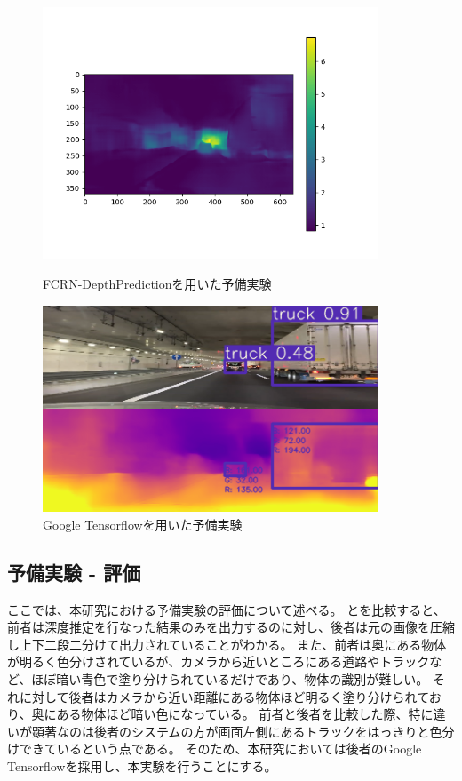 \begin{figure}[htbp]
   \begin{center}
    \includegraphics[width=10cm]{figs/preex1.png}
   \end{center}
   \caption{FCRN-DepthPredictionを用いた予備実験}
   \label{fig:preex1}

  \begin{center}
   \includegraphics[width=10cm]{figs/preex2.png}
  \end{center}
   \caption{Google Tensorflowを用いた予備実験}
   \label{fig:preex2}
 \end{figure}

\subsection{予備実験 - 評価}
ここでは、本研究における予備実験の評価について述べる。
とを比較すると、前者は深度推定を行なった結果のみを出力するのに対し、後者は元の画像を圧縮し上下二段二分けて出力されていることがわかる。
また、前者は奥にある物体が明るく色分けされているが、カメラから近いところにある道路やトラックなど、ほぼ暗い青色で塗り分けられているだけであり、物体の識別が難しい。
それに対して後者はカメラから近い距離にある物体ほど明るく塗り分けられており、奥にある物体ほど暗い色になっている。
前者と後者を比較した際、特に違いが顕著なのは後者のシステムの方が画面左側にあるトラックをはっきりと色分けできているという点である。
そのため、本研究においては後者のGoogle Tensorflowを採用し、本実験を行うことにする。

